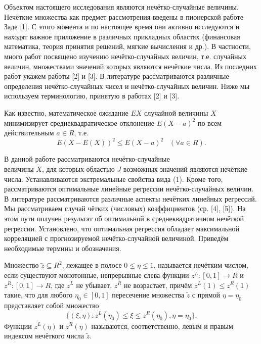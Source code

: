 \vzmscaption

Объектом настоящего исследования являются нечётко-случайные величины. Нечёткие множества как предмет рассмотрения введены в пионерской работе Заде [1]. С этого момента и по настоящее время они активно исследуются и находят важное приложение в различных прикладных областях (финансовая математика, теория принятия решений, мягкие вычисления и др.). В частности, много работ посвящено изучению нечётко-случайных величин, т.е. случайных величин, множествами значений которых являются нечёткие числа. Из последних работ укажем работы [2] и [3]. В литературе рассматриваются различные определения нечётко-случайных чисел и нечётко-случайных величин. Ниже мы используем терминологию, принятую в работах [2] и [3].



Как известно, математическое ожидание $EX$ случайной величины $X$ минимизирует среднеквадратическое отклонение $E(X-a)^2$ по всем действительным $a\in R$, т.е.
\begin{equation}
E(X-E(X))^2\leq E(X-a)^2\,\,\,\,\,(\forall a\in R).
\end{equation}

В данной работе рассматриваются нечётко-случайные
\\величины $\tilde{X}$, для которых областью $J$ возможных значений являются нечёткие числа. Устанавливаются экстремальные свойства вида (1). Кроме того, рассматриваются оптимальные линейные регрессии нечётко-случайных величин. В литературе рассматриваются различные аспекты нечётких линейных регрессий. Мы рассматриваем случай чётких (числовых) коэффициентов (ср. [4], [5]). На этом пути получен результат об оптимальной в среднеквадратичном нечёткой регрессии. Установлено, что оптимальная регрессия обладает максимальной корреляцией с прогнозируемой нечётко-случайной величиной. Приведём необходимые термины и обозначения.

Множество $\tilde{z}\subseteq R^2$, лежащее в полосе $0\leq \eta\leq 1$, называется нечётким числом, если существуют монотонные, непрерывные слева функции $z^L:[0,1]\rightarrow R$ и $z^R:[0,1]\rightarrow R$, где $z^L$ не убывает, $z^R$ не возрастает, причём $z^L(1)\leq z^R(1)$ такие, что для любого $\eta_0\in[0,1]$ пересечение множества $\tilde{z}$ с прямой $\eta=\eta_0$ представляет собой множество
$$
\{(\xi, \eta): z^L(\eta_0)\leq\xi\leq z^R(\eta_0), \eta=\eta_0\}.
$$
Функции $z^L(\eta)$ и $z^R(\eta)$ называются, соответственно, левым и правым индексом нечёткого числа $\tilde{z}$.

